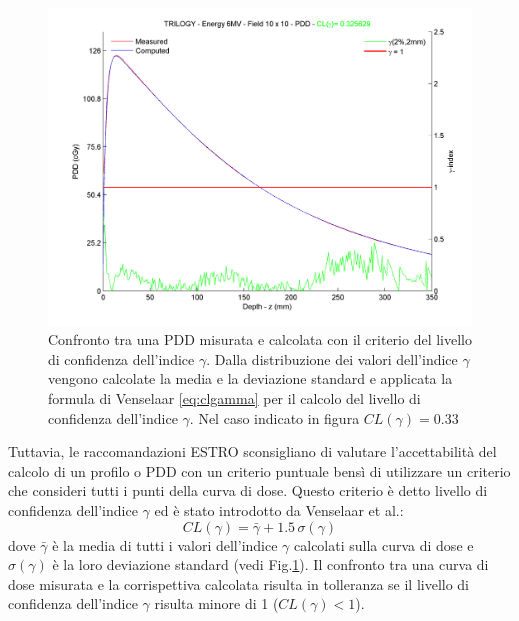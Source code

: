 \begin{figure}[!t]
\centering
\includegraphics[width=.9\textwidth]{./cap2/pdd10x10.png}
\caption{Confronto tra una PDD misurata e calcolata con il criterio del livello di confidenza dell'indice $\gamma$. Dalla distribuzione dei valori dell'indice $\gamma$ vengono calcolate la media e la deviazione standard e applicata la formula di Venselaar \eqref{eq:clgamma} per il calcolo del livello di confidenza dell'indice $\gamma$. Nel caso indicato in figura $CL(\gamma)=0.33$}
\label{fig:gamma10x10}
\end{figure}

Tuttavia, le raccomandazioni ESTRO sconsigliano di valutare l'accettabilità del calcolo di un profilo o PDD con un criterio puntuale bensì di utilizzare un criterio che consideri tutti i punti della curva di dose. Questo criterio è detto livello di confidenza dell'indice $\gamma$ ed è stato introdotto da Venselaar et al.\cite{Venselaar2001}:
\begin{equation}
CL(\gamma) = \bar{\gamma} + 1.5\,\sigma(\gamma)
\label{eq:clgamma}
\end{equation}
dove $\bar{\gamma}$ è la media di tutti i valori dell'indice $\gamma$ calcolati sulla curva di dose e $\sigma(\gamma)$ è la loro deviazione standard (vedi Fig.\ref{fig:gamma10x10}).
Il confronto tra una curva di dose misurata e la corrispettiva calcolata risulta in tolleranza se il livello di confidenza dell'indice $\gamma$ risulta minore di 1 ($CL(\gamma) < 1$).


